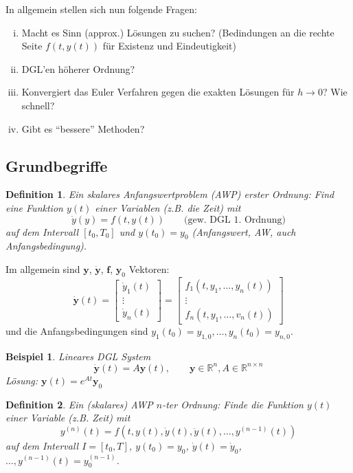 \documentclass[a4paper]{article}
\newtheorem{defn}{Definition}
\newtheorem{bsp}{Beispiel}
\renewcommand{\vec}[1]{\mathbf{\bm{#1}}}
\begin{document}
In allgemein stellen sich nun folgende Fragen:
\begin{enumerate}[(i)]
  \item Macht es Sinn (approx.) Lösungen zu suchen? (Bedindungen an die rechte
    Seite $f(t, y(t))$ für Existenz und Eindeutigkeit)
  \item DGL'en höherer Ordnung?
  \item Konvergiert das Euler Verfahren gegen die exakten Lösungen für $h \to
    0$? Wie schnell?
  \item Gibt es ``bessere'' Methoden?
\end{enumerate}

\subsection{Grundbegriffe}

\begin{defn}
  Ein skalares Anfangswertproblem (AWP) erster Ordnung: Find eine Funktion
  $y(t)$ einer Variablen (z.B. die Zeit) mit
  \[
    \dot{y}(y) = f(t, y(t))
    \qquad
    \text{(gew. DGL 1. Ordnung)}
  \]
  auf dem Intervall $[t_0, T_0]$ und $y(t_0) = y_0$ (Anfangswert, AW, auch
  Anfangsbedingung).
\end{defn}

Im allgemein sind $\vec{y}$, $\dot{\vec{y}}$, $\vec{f}$, $\vec{y}_0$ Vektoren:
\[
  \dot{\vec{y}}(t) = \begin{bmatrix}
    \dot{y}_1(t) \\ \vdots \\ \dot{y}_n(t)
  \end{bmatrix}
  = \begin{bmatrix}
    f_1(t, y_1, \ldots, y_n(t)) \\ \vdots \\ f_n(t, y_1, \ldots, v_n(t))
  \end{bmatrix}
\]
und die Anfangsbedingungen sind $y_1(t_0) = y_{1,0}, \ldots, y_n(t_0) =
y_{n,0}$.

\begin{bsp}
  Lineares DGL System
  \[
    \dot{\vec{y}}(t) = A \vec{y}(t), \qquad
    \vec{y} \in \mathbb{R}^n, A \in \mathbb{R}^{n\times n}
  \]
  Lösung: $\vec{y}(t) = e^{At} \vec{y}_0$
\end{bsp}

\begin{defn}
  Ein (skalares) AWP $n$-ter Ordnung: Finde die Funktion $y(t)$ einer
  Variable (z.B. Zeit) mit
  \[
    y^{(n)}(t) = f(t, y(t), \dot{y}(t), \ddot{y}(t), \ldots, y^{(n-1)}(t))
  \]
  auf dem Intervall $I= [t_0, T]$,
  $y(t_0) = y_0$, $\dot{y}(t) = \dot{y}_0$, $\ldots, y^{(n-1)}(t) =
  y_0^{(n-1)}$.
\end{defn}
\end{document}
